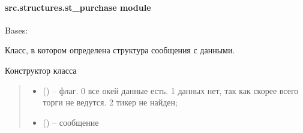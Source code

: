 \documentclass[letterpaper,10pt,english,openany,oneside]{sphinxmanual}
\begin{document}
\paragraph{src.structures.st\_purchase module}
\label{\detokenize{src.structures:module-src.structures.st_purchase}}\label{\detokenize{src.structures:src-structures-st-purchase-module}}

\begin{fulllineitems}
\label{\detokenize{src.structures:src.structures.st_purchase.DataMessage}}
\pysigstartsignatures
{}
\pysigstopsignatures
\sphinxAtStartPar
Bases: 

\sphinxAtStartPar
Класс, в котором определена структура сообщения с данными.

\begin{fulllineitems}
\label{\detokenize{src.structures:src.structures.st_purchase.DataMessage.__init__}}
\pysigstartsignatures
{}
\pysigstopsignatures
\sphinxAtStartPar
Конструктор класса
\begin{quote}\begin{description}
\begin{itemize}
\item {} 
\sphinxAtStartPar
{} () – флаг. 0 \sphinxhyphen{} все окей данные есть. 1 \sphinxhyphen{} данных нет, так как скорее всего торги не ведутся.
2 \sphinxhyphen{} тикер не найден;

\item {} 
\sphinxAtStartPar
{} () – сообщение

\end{itemize}

\end{description}\end{quote}

\end{fulllineitems}


\end{fulllineitems}
\end{document}
